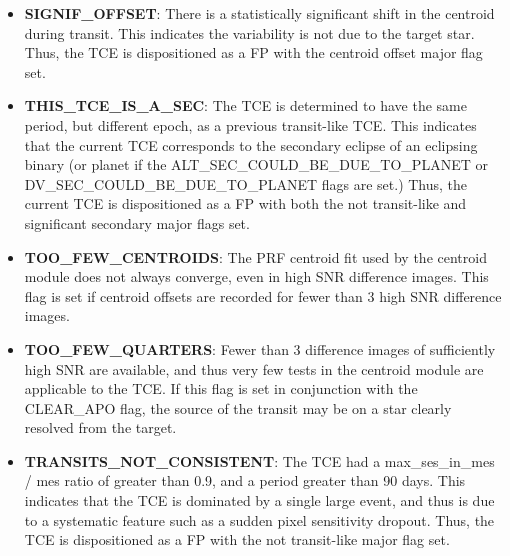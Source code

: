 \begin{itemize}
\item[] \textbf{SIGNIF\_OFFSET}: There is a statistically significant shift in the centroid during transit. This indicates the variability is not due to the target star. Thus, the TCE is dispositioned as a FP with the centroid offset major flag set.
\item[] \textbf{THIS\_TCE\_IS\_A\_SEC}: The TCE is determined to have the same period, but different epoch, as a previous transit-like TCE. This indicates that the current TCE corresponds to the secondary eclipse of an eclipsing binary (or planet if the ALT\_SEC\_COULD\_BE\_DUE\_TO\_PLANET or DV\_SEC\_COULD\_BE\_DUE\_TO\_PLANET flags are set.) Thus, the current TCE is dispositioned as a FP with both the not transit-like and significant secondary major flags set.
\item[] \textbf{TOO\_FEW\_CENTROIDS}: The PRF centroid fit used by the centroid module does not always converge, even in high SNR difference images. This flag is set if centroid offsets are recorded for fewer than 3 high SNR difference images.
\item[] \textbf{TOO\_FEW\_QUARTERS}: Fewer than 3 difference images of sufficiently high SNR are available, and thus very few tests in the centroid module are applicable to the TCE. If this flag is set in conjunction with the CLEAR\_APO flag, the source of the transit may be on a star clearly resolved from the target.
\item[] \textbf{TRANSITS\_NOT\_CONSISTENT}: The TCE had a max\_ses\_in\_mes / mes ratio of greater than 0.9, and a period greater than 90 days. This indicates that the TCE is dominated by a single large event, and thus is due to a systematic feature such as a sudden pixel sensitivity dropout. Thus, the TCE is dispositioned as a FP with the not transit-like major flag set.
\end{itemize}
